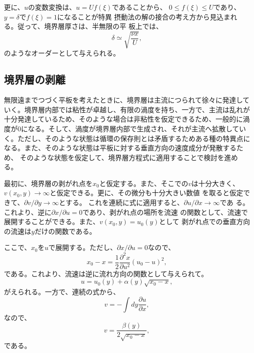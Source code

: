  更に、$u$の変数変換は、$u = U f(\xi)$であることから、
 $0\leq f(\xi) \leq U$であり、$y = \delta$で$f(\xi) = 1$になることが特異
 摂動法の解の接合の考え方から見込まれる。従って、境界層厚さは、半無限の平
 板上では、
\begin{equation}
 \delta \simeq \sqrt{\frac{\nu x}{U}},
\end{equation}
 のようなオーダーとして与えられる。


\subsection{境界層の剥離}
無限遠までつづく平板を考えたときに、境界層は主流につられて徐々に発達して
いく。境界層内部では粘性が卓越し、有限の渦度を持ち、一方で、主流は乱れが
十分発達しているため、そのような場合は非粘性を仮定できるため、一般的に渦
度が0になる。そして、渦度が境界層内部で生成され、それが主流へ拡散してい
く。ただし、そのような状態は循環の保存則とは矛盾するためある種の特異点に
なる。また、そのような状態は平板に対する垂直方向の速度成分が発散するため、
そのような状態を仮定して、境界層方程式に適用することで検討を進める。

最初に、境界層の剥がれ点を$x_0$と仮定する。また、そこでの$v$は十分大きく、
$v(x_0,y)\rightarrow\infty$と仮定できる。更に、その微分も十分大きい数値
を取ると仮定できて、$\partial v/\partial y \rightarrow\infty$とする。
これを連続に式に適用すると、$\partial u/\partial x\rightarrow\infty$であ
る。これより、逆に$\partial x/\partial u=0$であり、剥がれ点の場所を流速
の関数として、流速で展開することができる。また、$v(x_0,y)=u_0(y)$として
剥がれ点での垂直方向の流速は$y$だけの関数である。

ここで、$x_0$を$u$で展開する。ただし、$\partial x/\partial u=0$なので、
\begin{equation}
  x_0-x = \frac{1}{2}\frac{\partial^2x}{\partial u^2} (u_0 - u)^2,
\end{equation}
である。これより、流速は逆に流れ方向の関数として与えられて。
\begin{equation}
 u = u_0(y) + \alpha (y)\sqrt{x_0-x},
\end{equation}
がえられる。一方で、連続の式から、
\[
 v = -\int dy \frac{\partial u}{\partial x},
\]
なので、
\begin{equation}
 v = \frac{\beta(y)}{2\sqrt{x_0-x}},
\end{equation}
である。

